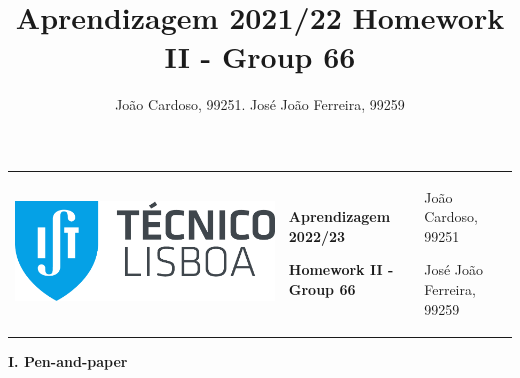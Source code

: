 \documentclass[11pt,a4paper]{article}
\title{Aprendizagem 2021/22 Homework II - Group 66}
\author{João Cardoso, 99251. José João Ferreira, 99259}
\begin{document}
\color{darkgray}
\hspace{-8.25mm}
\begin{tabularx}{1.09\textwidth} {>{\raggedright\arraybackslash}X >{\centering\arraybackslash}X >{\raggedleft\arraybackslash}X}
  \includegraphics[scale=0.2]{tecnico.pdf} &
  \textbf{Aprendizagem 2022/23} \par \textbf{Homework II - Group 66} &
  João Cardoso, 99251 \par José João Ferreira, 99259
\end{tabularx}
\color{black}

\begin{center}
\textbf{I. Pen-and-paper}
\end{center}
\end{document}
